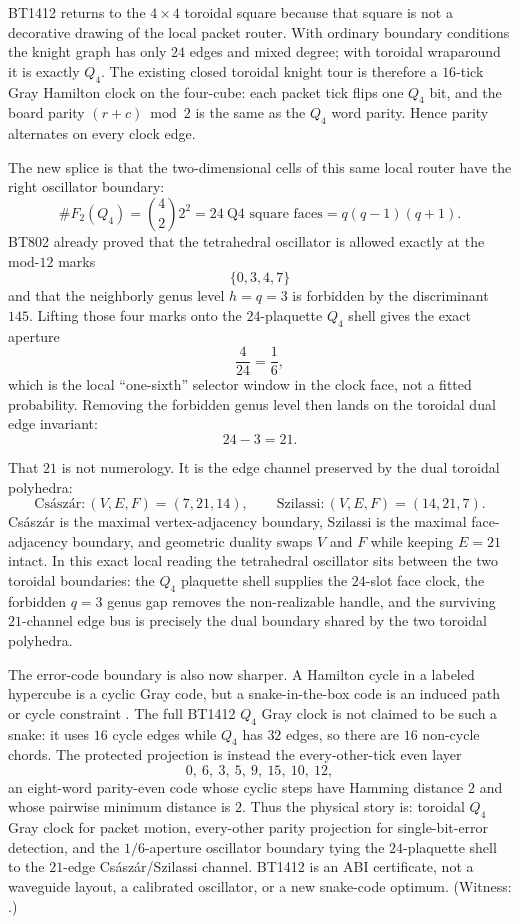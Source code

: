 \documentclass[11pt]{article}
\begin{document}
BT1412 returns to the \(4\times4\) toroidal square because that square is not a
decorative drawing of the local packet router.  With ordinary boundary
conditions the knight graph has only \(24\) edges and mixed degree; with
toroidal wraparound it is exactly \(Q_4\).  The existing closed toroidal knight
tour is therefore a \(16\)-tick Gray Hamilton clock on the four-cube: each
packet tick flips one \(Q_4\) bit, and the board parity \((r+c)\bmod2\) is the
same as the \(Q_4\) word parity.  Hence parity alternates on every clock edge.

The new splice is that the two-dimensional cells of this same local router have
the right oscillator boundary:
\[
  \#F_2(Q_4)=\binom42 2^2
  =
  24\ \text{Q4 square faces}
  =
  q(q-1)(q+1).
\]
BT802 already proved that the tetrahedral oscillator is allowed exactly at the
mod-\(12\) marks
\[
  \{0,3,4,7\}
\]
and that the neighborly genus level \(h=q=3\) is forbidden by the discriminant
\(145\).  Lifting those four marks onto the \(24\)-plaquette \(Q_4\) shell gives
the exact aperture
\[
  \frac{4}{24}=\frac16,
\]
which is the local ``one-sixth'' selector window in the clock face, not a fitted
probability.  Removing the forbidden genus level then lands on the toroidal dual
edge invariant:
\[
  24-3=21.
\]

That \(21\) is not numerology.  It is the edge channel preserved by the dual
toroidal polyhedra:
\[
  \text{Cs\'asz\'ar}: (V,E,F)=(7,21,14),\qquad
  \text{Szilassi}: (V,E,F)=(14,21,7).
\]
Cs\'asz\'ar is the maximal vertex-adjacency boundary, Szilassi is the maximal
face-adjacency boundary, and geometric duality swaps \(V\) and \(F\) while
keeping \(E=21\) intact.  In this exact local reading the tetrahedral oscillator
sits between the two toroidal boundaries: the \(Q_4\) plaquette shell supplies
the \(24\)-slot face clock, the forbidden \(q=3\) genus gap removes the
non-realizable handle, and the surviving \(21\)-channel edge bus is precisely the
dual boundary shared by the two toroidal polyhedra.

The error-code boundary is also now sharper.  A Hamilton cycle in a labeled
hypercube is a cyclic Gray code, but a snake-in-the-box code is an induced path
or cycle constraint \cite{kautz-unit-distance,wilmer-ernst-gray}.  The full
BT1412 \(Q_4\) Gray clock is not claimed to be such a snake: it uses \(16\)
cycle edges while \(Q_4\) has \(32\) edges, so there are \(16\) non-cycle chords.
The protected projection is instead the every-other-tick even layer
\[
  0,\ 6,\ 3,\ 5,\ 9,\ 15,\ 10,\ 12,
\]
an eight-word parity-even code whose cyclic steps have Hamming distance \(2\)
and whose pairwise minimum distance is \(2\).  Thus the physical story is:
toroidal \(Q_4\) Gray clock for packet motion, every-other parity projection for
single-bit-error detection, and the \(1/6\)-aperture oscillator boundary tying
the \(24\)-plaquette shell to the \(21\)-edge Cs\'asz\'ar/Szilassi channel.
BT1412 is an ABI certificate, not a waveguide layout, a calibrated oscillator,
or a new snake-code optimum.  (Witness:
.)
\end{document}
